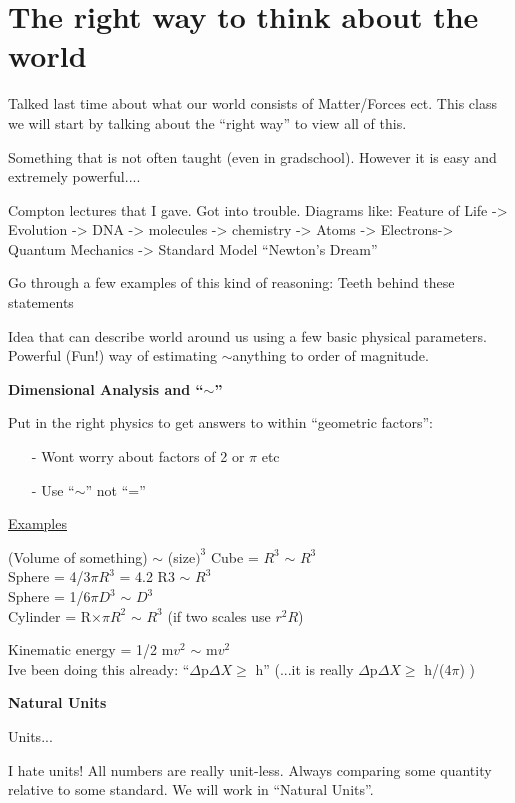 {\fontsize{14}{16}\selectfont

\section*{The right way to think about the world}

Talked last time about what our world consists of Matter/Forces ect.
This class we will start by talking about the ``right way'' to view all of this. 

Something that is not often taught (even in gradschool).
However it is easy and extremely powerful....

Compton lectures that I gave. 
Got into trouble. 
Diagrams like: 
Feature of Life -> Evolution -> DNA -> molecules -> chemistry  -> Atoms ->  Electrons-> Quantum Mechanics -> Standard Model
``Newton's Dream''

Go through a few examples of this kind of reasoning:
Teeth behind these statements

Idea that can describe world around us using a few basic physical parameters.
Powerful (Fun!) way of estimating $\sim$anything to order of magnitude.

\textbf{Dimensional Analysis and ``$\sim$''}

Put in the right physics to get answers to within ``geometric factors'':
\begin{itemize}
\item[-] Wont worry about factors of 2 or $\pi$ etc
\item[-] Use ``$\sim$'' not ``=''
\end{itemize}

\underline{Examples}

(Volume of something) $\sim$ (size$)^3$
Cube = $R^{3}$ $\sim$ $R^3$\\
Sphere = 4/3$\pi R^3$ = 4.2 R3 $\sim$ $R^3$\\
Sphere = 1/6$\pi D^3$  $\sim$ $D^3$\\
Cylinder = R$\times\pi R^{2}$  $\sim$ $R^3$  (if two scales use $r^2R$) 

Kinematic energy = 1/2 m$v^2$ $\sim$ m$v^2$\\
Ive been doing this already: ``$\Delta$p$\Delta X \geq $ h''
(...it is really $\Delta$p$\Delta X \geq $ h/(4$\pi$) )

\textbf{Natural Units}

Units...

I hate units! All numbers are really unit-less.
Always comparing some quantity relative to some standard. 
We will work in “Natural Units”.

}
